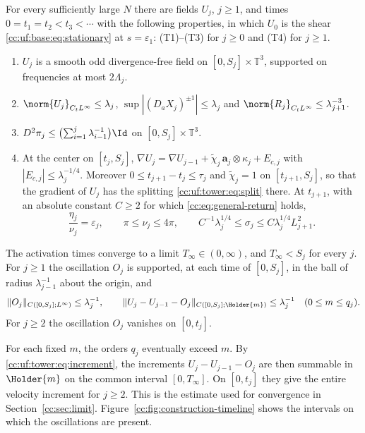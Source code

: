 \begin{theorem}\label{cc:uf:tower:thm:finite}
For every sufficiently large $N$ there are fields $U_j$, $j\ge1$, and
times $0=t_1=t_2<t_3<\cdots$ with the following properties, in which
$U_0$ is the shear \eqref{cc:uf:base:eq:stationary} at $s=\varepsilon_1$:
\textup{(T1)}--\textup{(T3)} for $j\ge0$ and \textup{(T4)} for $j\ge1$.
\begin{enumerate}[label=(T\arabic*),leftmargin=*]
\item $U_j$ is a smooth odd divergence-free field on
$[0,S_j]\times\mathbb T^3$, supported on frequencies at most $2\Lambda_j$.
\item $\norm{U_j}_{C_tL^\infty}\le\lambda_j$,
$\sup|(D_aX_j)^{\pm1}|\le\lambda_j$ and
$\norm{R_j}_{C_tL^\infty}\le\lambda_{j+1}^{-3}$.
\item $D^2\pi_j\le\bigl(\sum_{i=1}^j\lambda_{i-1}^{-1}\bigr)\Id$ on
$[0,S_j]\times\mathbb T^3$.
\item At the center on $[t_j,S_j]$,
$\nabla U_j=\nabla U_{j-1}
+\widetilde\chi_j\,\mathbf a_j\otimes\kappa_j+E_{c,j}$ with
$|E_{c,j}|\le\lambda_j^{-1/4}$. Moreover
$0\le t_{j+1}-t_j\le\tau_j$ and $\widetilde\chi_j=1$ on
$[t_{j+1},S_j]$, so that the gradient of $U_j$ has the splitting
\eqref{cc:uf:tower:eq:split} there. At $t_{j+1}$, with an absolute
constant $C\ge2$ for which \eqref{cc:eq:general-return} holds,
\begin{equation}\label{cc:uf:tower:eq:late-values}
 \frac{\eta_j}{\nu_j}=\varepsilon_j,\qquad
 \pi\le\nu_j\le4\pi,\qquad
 C^{-1}\lambda_j^{1/4}\le\sigma_j\le C\lambda_j^{1/4}L_{j+1}^2 .
\end{equation}
\end{enumerate}
The activation times converge to a limit
$T_\infty\in(0,\infty)$, and $T_\infty<S_j$ for every $j$. For $j\ge1$
the oscillation $O_j$ is supported, at each time of $[0,S_j]$, in the
ball of radius $\lambda_{j-1}^{-1}$ about the origin, and
\begin{equation}\label{cc:uf:tower:eq:increment}
 \|O_j\|_{C([0,S_j];L^\infty)}\le\lambda_j^{-1},\qquad
 \|U_j-U_{j-1}-O_j\|_{C([0,S_j];\Holder{m})}\le\lambda_j^{-1}
 \quad(0\le m\le q_j).
\end{equation}
For $j\ge2$ the oscillation $O_j$ vanishes on $[0,t_j]$.
\end{theorem}

For each fixed $m$, the orders $q_j$ eventually exceed $m$. By
\eqref{cc:uf:tower:eq:increment}, the increments $U_j-U_{j-1}-O_j$
are then summable in $\Holder{m}$ on the common interval $[0,T_\infty]$.
On $[0,t_j]$ they give the entire velocity increment for $j\ge2$.
This is the estimate used for convergence in
Section~\ref{cc:sec:limit}. Figure~\ref{cc:fig:construction-timeline}
shows the intervals on which the oscillations are present.

